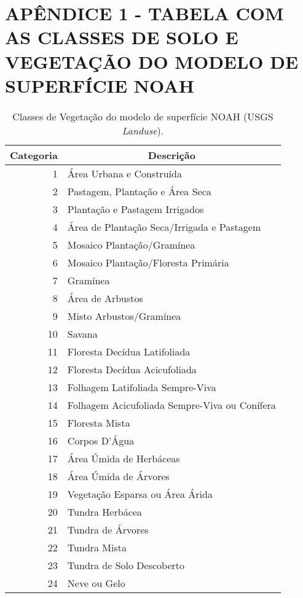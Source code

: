 \hypertarget{estilo:apendice1}{}

\chapter{APÊNDICE 1 - TABELA COM AS CLASSES DE SOLO E VEGETAÇÃO DO MODELO DE SUPERFÍCIE NOAH}
\label{apendice1}

\begin{table}[htbp]
\caption{Classes de Vegetação do modelo de superfície NOAH (USGS \textit{Landuse}).}
\label{tab05}
\centering
\begin{tabular}{r|l|l|l|l|l}
\hline
\multicolumn{1}{l|}{Categoria} & \multicolumn{ 5}{c}{Descrição} \\ \hline
1  & \multicolumn{ 5}{l}{Área Urbana e Construída} \\
2  & \multicolumn{ 5}{l}{Pastagem, Plantação e Área Seca} \\
3  & \multicolumn{ 5}{l}{Plantação e Pastagem Irrigados} \\
4  & \multicolumn{ 5}{l}{Área de Plantação Seca/Irrigada e Pastagem} \\
5  & \multicolumn{ 5}{l}{Mosaico Plantação/Gramínea} \\
6  & \multicolumn{ 5}{l}{Mosaico Plantação/Floresta Primária} \\
7  & \multicolumn{ 5}{l}{Gramínea} \\
8  & \multicolumn{ 5}{l}{Área de Arbustos} \\
9  & \multicolumn{ 5}{l}{Misto Arbustos/Gramínea} \\
10 & \multicolumn{ 5}{l}{Savana} \\
11 & \multicolumn{ 5}{l}{Floresta Decídua Latifoliada} \\
12 & \multicolumn{ 5}{l}{Floresta Decídua Acicufoliada} \\
13 & \multicolumn{ 5}{l}{Folhagem Latifoliada Sempre-Viva} \\ 
14 & \multicolumn{ 5}{l}{Folhagem Acicufoliada Sempre-Viva ou Conífera} \\
15 & \multicolumn{ 5}{l}{Floresta Mista} \\
16 & \multicolumn{ 5}{l}{Corpos D'Água} \\
17 & \multicolumn{ 5}{l}{Área Úmida de Herbáceas} \\
18 & \multicolumn{ 5}{l}{Área Úmida de Árvores} \\
19 & \multicolumn{ 5}{l}{Vegetação Esparsa ou Área Árida} \\
20 & \multicolumn{ 5}{l}{Tundra Herbácea} \\
21 & \multicolumn{ 5}{l}{Tundra de Árvores} \\
22 & \multicolumn{ 5}{l}{Tundra Mista} \\
23 & \multicolumn{ 5}{l}{Tundra de Solo Descoberto} \\
24 & \multicolumn{ 5}{l}{Neve ou Gelo} \\ \hline
\end{tabular}
\label{Tabela das Classes de Vegetação}
\end{table}

